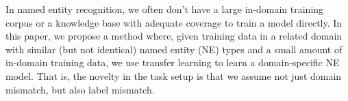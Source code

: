 In named entity recognition, we often don't have a large in-domain training corpus or a knowledge base with adequate coverage to train a model directly. In this paper, we propose a method where, given training data in a related domain with similar (but not identical) named entity (NE) types and a small amount of in-domain training data, we use transfer learning to learn a domain-specific NE model. That is, the novelty in the task setup is that we assume not just domain mismatch, but also label mismatch.
